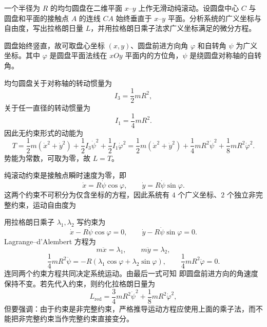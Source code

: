 
\begin{question}[圆盘的非完整约束]
一个半径为 $R$ 的均匀圆盘在二维平面 $x$--$y$ 上作无滑动纯滚动。设圆盘中心 $C$ 与圆盘和平面的接触点 $A$ 的连线 $CA$ 始终垂直于 $x$--$y$ 平面。分析系统的广义坐标与自由度，写出拉格朗日量 $L$，并用拉格朗日乘子法求广义坐标满足的微分方程。

\begin{solution}
圆盘始终竖直，故可取盘心坐标 $(x,y)$、圆盘前进方向角 $\varphi$ 和自转角 $\psi$ 为广义坐标。其中 $\varphi$ 是圆盘平面法线在 $xOy$ 平面内的方位角，$\psi$ 是绕圆盘对称轴的自转角。

均匀圆盘关于对称轴的转动惯量为
\[
  I_3=\frac12mR^2,
\]
关于任一直径的转动惯量为
\[
  I_1=\frac14mR^2.
\]
因此无约束形式的动能为
\[
  T=\frac12m(\dot x^2+\dot y^2)
    +\frac12 I_3\dot\psi^2+\frac12 I_1\dot\varphi^2
  =\frac12m(\dot x^2+\dot y^2)
    +\frac14mR^2\dot\psi^2+\frac18mR^2\dot\varphi^2 .
\]
势能为常数，可取为零，故 $L=T$。

纯滚动约束是接触点瞬时速度为零，即
\[
  \dot x=R\dot\psi\cos\varphi,
  \qquad
  \dot y=R\dot\psi\sin\varphi .
\]
这两个约束不可积分为仅含坐标的方程，因此系统有 $4$ 个广义坐标、$2$ 个独立非完整约束，运动自由度为

用拉格朗日乘子 $\lambda_1,\lambda_2$ 写约束为
\[
  \dot x-R\dot\psi\cos\varphi=0,
  \qquad
  \dot y-R\dot\psi\sin\varphi=0 .
\]
Lagrange--d'Alembert 方程为
\[
  m\ddot x=\lambda_1,
  \qquad
  m\ddot y=\lambda_2,
\]
\[
  \frac14mR^2\ddot\psi
  =-R(\lambda_1\cos\varphi+\lambda_2\sin\varphi),
  \qquad
  \frac14mR^2\ddot\varphi=0.
\]
连同两个约束方程共同决定系统运动。由最后一式可知
即圆盘前进方向的角速度保持不变。若先代入约束，则约化拉格朗日量为
\[
  L_{\mathrm{red} }
  =\frac34mR^2\dot\psi^2+\frac18mR^2\dot\varphi^2,
\]
但要强调：由于约束是非完整约束，严格推导运动方程应使用上面的乘子法，而不能把非完整约束当作完整约束直接变分。
\end{solution}

\end{question}

